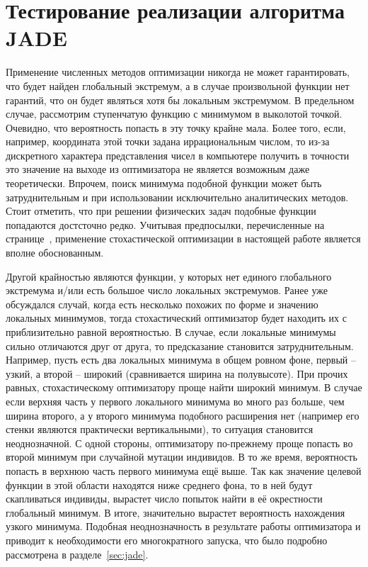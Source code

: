 \section{Тестирование реализации алгоритма JADE}
\label{sec:test-jade}
Применение численных методов оптимизации никогда не может
гарантировать, что будет найден глобальный экстремум, а в случае
произвольной функции нет гарантий, что он будет являться хотя бы
локальным экстремумом.  В предельном случае, рассмотрим ступенчатую
функцию с минимумом в выколотой точкой.  Очевидно, что вероятность
попасть в эту точку крайне мала.  Более того, если, например,
координата этой точки задана иррациональным числом, то из-за
дискретного характера представления чисел в компьютере получить в
точности это значение на выходе из оптимизатора не является возможным
даже теоретически.  Впрочем, поиск минимума подобной функции может
быть затруднительным и при использовании исключительно аналитических
методов.  Стоит отметить, что при решении физических задач подобные
функции попадаются достсточно редко.  Учитывая предпосылки,
перечисленные на странице~\pageref{ref:why-jade}, применение
стохастической оптимизации в настоящей работе является вполне
обоснованным.

Другой крайностью являются функции, у которых нет единого глобального
экстремума и/или есть большое число локальных экстремумов.  Ранее уже
обсуждался случай, когда есть несколько похожих по форме и значению
локальных минимумов, тогда стохастический оптимизатор будет находить
их с приблизительно равной вероятностью.  В случае, если локальные
минимумы сильно отличаются друг от друга, то предсказание становится
затруднительным.  Например, пусть есть два локальных минимума в общем
ровном фоне, первый -- узкий, а второй -- широкий (сравнивается ширина
на полувысоте). При прочих равных, стохастическому оптимизатору проще
найти широкий минимум. В случае если верхняя часть у первого
локального минимума во много раз больше, чем ширина второго, а у
второго минимума подобного расширения нет (например его стенки
являются практически вертикальными), то ситуация становится
неоднозначной.  С одной стороны, оптимизатору по-прежнему проще
попасть во второй минимум при случайной мутации индивидов. В то же
время, вероятность попасть в верхнюю часть первого минимума ещё
выше. Так как значение целевой функции в этой области находятся ниже
среднего фона, то в ней будут скапливаться индивиды, вырастет число
попыток найти в её окрестности глобальный минимум.  В итоге,
значительно вырастет вероятность нахождения узкого минимума.  Подобная
неоднозначность в результате работы оптимизатора и приводит к
необходимости его многократного запуска, что было подробно рассмотрена
в разделе~\ref{sec:jade}.


